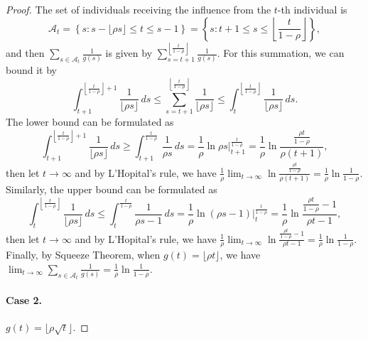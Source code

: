 \documentclass[12pt]{article}
\begin{document}
\begin{proof}
\noindent
The set of individuals receiving the influence from the $t$-th individual is
\[
\mathcal{A}_t =\left\{s: s- \lfloor \rho s \rfloor \le t \le s-1 \right\} = \left\{s: t+1 \le s \le \left\lfloor \frac{t}{1-\rho} \right\rfloor \right\},
\]
and then $\sum_{s\in \mathcal{A}_t} \frac{1}{g(s)}$ is given by $\sum_{s=t+1}^{\left\lfloor \frac{t}{1-\rho} \right\rfloor} \frac{1}{g(s)}$. For this summation, we can bound it by
\[
\int_{t+1}^{\left\lfloor \frac{t}{1-\rho} \right\rfloor+1}\frac{1} {\lfloor \rho s\rfloor} \, ds \le \sum_{s=t+1}^{\left\lfloor \frac{t}{1-\rho} \right\rfloor} \frac{1}{\lfloor \rho s \rfloor} \le \int_t^{\left\lfloor \frac{t}{1-\rho} \right\rfloor}\frac{1} {\lfloor \rho s\rfloor} \, ds.
\]
The lower bound can be formulated as
\[
\int_{t+1}^{\left\lfloor \frac{t}{1-\rho} \right\rfloor+1}\frac{1} {\lfloor \rho s\rfloor}\,ds \ge \int_{t+1}^{\frac{t}{1-\rho}} \frac{1}{\rho s}\,ds = \frac{1}{\rho} \ln{\rho s}\Big|_{t+1}^{\frac{t}{1-\rho}} = \frac{1}{\rho} \ln{\frac{\frac{\rho t}{1-\rho}}{\rho(t+1)}},
\]
then let $t \to \infty$ and by L'Hopital's rule, we have $\frac{1}{\rho} \lim_{t \to \infty}\ln{\frac{\frac{\rho t}{1-\rho}}{\rho(t+1)}} = \frac{1}{\rho} \ln{\frac{1}{1-\rho}}$. Similarly, the upper bound can be formulated as 
\[
\int_t^{\left\lfloor \frac{t}{1-\rho} \right\rfloor}\frac{1} {\lfloor \rho s\rfloor} \, ds \le \int_t^{\frac{t}{1-\rho}}\frac{1} {\rho s-1} \, ds = \frac{1}{\rho}\ln{(\rho s-1)}\Big|_{t}^{\frac{t}{1-\rho}} = \frac{1}{\rho}\ln{\frac{\frac{\rho t}{1-\rho}-1}{\rho t-1}},
\]
then let $t \to \infty$ and by L'Hopital's rule, we have $\frac{1}{\rho} \lim_{t \to \infty}\ln{\frac{\frac{\rho t}{1-\rho}-1}{\rho t-1}} = \frac{1}{\rho} \ln{\frac{1}{1-\rho}}$.
Finally, by Squeeze Theorem, when $g(t) = \lfloor \rho t \rfloor$, we have $\lim_{t \to \infty} \sum_{s \in \mathcal{A}_t} \frac{1}{g(s)} = \frac{1}{\rho} \ln{\frac{1}{1-\rho}}$.

\paragraph{Case 2.} $g(t) = \lfloor \rho \sqrt{t} \rfloor$.


\end{proof}
\end{document}
